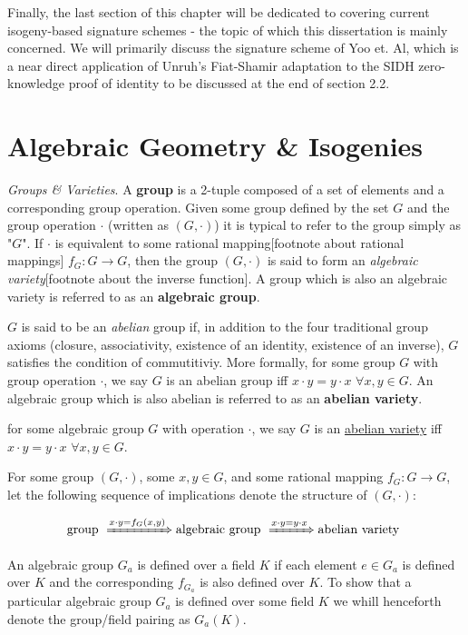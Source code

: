 Finally, the last section of this chapter will be dedicated to covering current isogeny-based signature schemes - the topic of which this dissertation is mainly concerned. We will primarily discuss the signature scheme of Yoo et. Al, which is a near direct application of Unruh's Fiat-Shamir adaptation to the SIDH zero-knowledge proof of identity to be discussed at the end of section 2.2.\\

\section{Algebraic Geometry \& Isogenies}
\emph{Groups \& Varieties}. A \textbf{group} is a 2-tuple composed of a set of elements and a corresponding group operation. Given some group defined by the set $G$ and the group operation $\cdot$ (written as $(G,\cdot)$) it is typical to refer to the group simply as "$G$". If $\cdot$ is equivalent to some rational mapping[footnote about rational mappings] $f_G: G \rightarrow G$, then the group $(G,\cdot)$ is said to form an \textit{algebraic variety}[footnote about the inverse function]. A group which is also an algebraic variety is referred to as an \textbf{algebraic group}.

$G$ is said to be an \emph{abelian} group if, in addition to the four traditional group axioms (closure, associativity, existence of an identity, existence of an inverse), $G$ satisfies the condition of commutitiviy. More formally, for some group $G$ with group operation $\cdot$, we say $G$ is an abelian group iff $x \cdot y = y \cdot x$ $\forall x, y \in G$. An algebraic group which is also abelian is referred to as an \textbf{abelian variety}.

\begin{definition}
\label{defn:abelianvariety}
for some algebraic group $G$ with operation $\cdot$, we say $G$ is an \underline{abelian variety} iff $x \cdot y = y \cdot x$ $\forall x, y \in G$. 
\end{definition}

For some group $(G,\cdot)$, some $x,y \in G$, and some rational mapping $f_G: G \rightarrow G$, let the following sequence of implications denote the structure of $(G,\cdot)$:

$$
\text{group } \xRightarrow[]{x\cdot y = f_G(x,y)} \text{algebraic group } \xRightarrow[]{x\cdot y = y\cdot x} \text{abelian variety }
$$

An algebraic group $G_a$ is defined over a field $K$ if each element $e \in G_a$ is defined over $K$ and the corresponding $f_{G_a}$ is also defined over $K$. To show that a particular algebraic group $G_a$ is defined over some field $K$ we whill henceforth denote the group/field pairing as $G_a(K)$.

